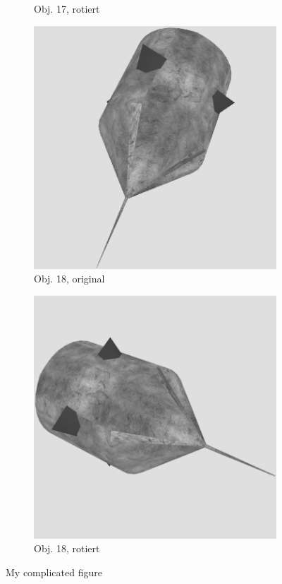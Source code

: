 \begin{figure}
\begin{subfigure}{0.2\textwidth}
\caption{Obj. 17, rotiert} \label{fig:d}
\end{subfigure} \hspace{.5cm}%
\begin{subfigure}{0.2\textwidth}
\includegraphics[width=\linewidth]{Bilder/Objekt18A.png}
\caption{Obj. 18, original} \label{fig:e}
\end{subfigure}\hspace{.5cm}
\begin{subfigure}{0.2\textwidth}
\includegraphics[width=\linewidth]{Bilder/Objekt18B.png}
\caption{Obj. 18, rotiert} \label{fig:f}
\end{subfigure}\hspace{.5cm}

\caption{My complicated figure} \label{fig:1}
\end{figure}

